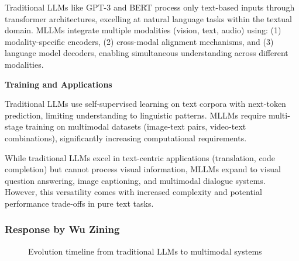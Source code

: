 \documentclass[12pt,a4paper]{article}
\begin{document}
Traditional LLMs like GPT-3 and BERT process only text-based inputs through transformer architectures, excelling at natural language tasks within the textual domain. MLLMs integrate multiple modalities (vision, text, audio) using: (1) modality-specific encoders, (2) cross-modal alignment mechanisms, and (3) language model decoders, enabling simultaneous understanding across different modalities.

\textbf{Training and Applications}

Traditional LLMs use self-supervised learning on text corpora with next-token prediction, limiting understanding to linguistic patterns. MLLMs require multi-stage training on multimodal datasets (image-text pairs, video-text combinations), significantly increasing computational requirements.

While traditional LLMs excel in text-centric applications (translation, code completion) but cannot process visual information, MLLMs expand to visual question answering, image captioning, and multimodal dialogue systems. However, this versatility comes with increased complexity and potential performance trade-offs in pure text tasks.

\subsubsection{Response by Wu Zining}

\begin{figure}[H]
    \centering
    \caption{Evolution timeline from traditional LLMs to multimodal systems}
    \label{fig:mllm_evolution_wu}
\end{figure}
\end{document}
